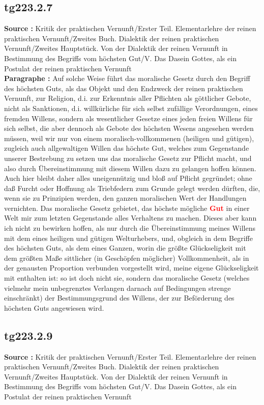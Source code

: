 \documentclass[a4paper,12pt,twoside]{book}
\newcommand{\match}[1]{\textcolor{red}{\textbf{#1}}}
\begin{document}
	\subsection*{tg223.2.7} 
	\textbf{Source : }Kritik der praktischen Vernunft/Erster Teil. Elementarlehre der reinen praktischen Vernunft/Zweites Buch. Dialektik der reinen praktischen Vernunft/Zweites Hauptstück. Von der Dialektik der reinen Vernunft in Bestimmung des Begriffs vom höchsten Gut/V. Das Dasein Gottes, als ein Postulat der reinen praktischen Vernunft\\  
	
	\textbf{Paragraphe : }
	Auf solche Weise führt das moralische Gesetz durch den Begriff des höchsten Guts, als das Objekt und den Endzweck der reinen praktischen Vernunft, zur Religion, d.i. zur Erkenntnis aller Pflichten als göttlicher Gebote, nicht als Sanktionen, d.i. willkürliche für sich selbst zufällige Verordnungen, eines fremden Willens, sondern als wesentlicher Gesetze eines jeden freien Willens für sich selbst, die aber dennoch als Gebote des höchsten Wesens angesehen werden müssen, weil wir nur von einem moralisch-vollkommenen (heiligen und gütigen), zugleich auch allgewaltigen Willen das höchste Gut, welches zum Gegenstande unserer Bestrebung zu setzen uns das moralische Gesetz zur Pflicht macht, und also durch Übereinstimmung mit diesem Willen dazu zu gelangen hoffen können. Auch hier bleibt daher alles uneigennützig und bloß auf Pflicht gegründet; ohne daß Furcht oder Hoffnung als Triebfedern zum Grunde gelegt werden dürften, die, wenn sie zu Prinzipien werden, den ganzen moralischen Wert der Handlungen vernichten. Das moralische Gesetz gebietet, das höchste mögliche \match{Gut} in einer Welt mir zum letzten Gegenstande alles Verhaltens zu machen. Dieses aber kann ich nicht zu bewirken hoffen, als nur durch die Übereinstimmung meines Willens mit dem eines heiligen und gütigen Welturhebers, und, obgleich in dem Begriffe des höchsten Guts, als dem eines Ganzen, worin die größte Glückseligkeit mit dem größten Maße sittlicher (in Geschöpfen möglicher) Vollkommenheit, als in der genausten Proportion verbunden vorgestellt wird, meine eigene Glückseligkeit mit enthalten ist: so ist doch nicht sie, sondern das moralische Gesetz (welches vielmehr mein unbegrenztes Verlangen darnach auf Bedingungen strenge einschränkt) der Bestimmungsgrund des Willens, der zur Beförderung des höchsten Guts angewiesen wird. 
	
	\subsection*{tg223.2.9} 
	\textbf{Source : }Kritik der praktischen Vernunft/Erster Teil. Elementarlehre der reinen praktischen Vernunft/Zweites Buch. Dialektik der reinen praktischen Vernunft/Zweites Hauptstück. Von der Dialektik der reinen Vernunft in Bestimmung des Begriffs vom höchsten Gut/V. Das Dasein Gottes, als ein Postulat der reinen praktischen Vernunft\\  
	
\end{document}
